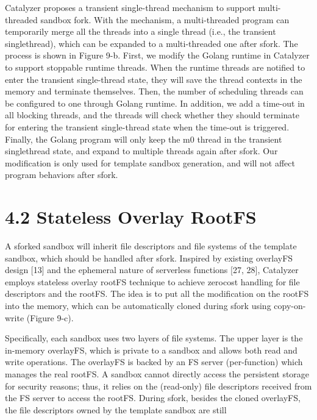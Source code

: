 \documentclass[
  10
]{article}
\begin{document}
Catalyzer proposes a transient single-thread mechanism to support
multi-threaded sandbox fork. With the mechanism, a multi-threaded
program can temporarily merge all the threads into a single thread
(i.e., the transient singlethread), which can be expanded to a
multi-threaded one after sfork. The process is shown in Figure 9-b.
First, we modify the Golang runtime in Catalyzer to support stoppable
runtime threads. When the runtime threads are notified to enter the
transient single-thread state, they will save the thread contexts in the
memory and terminate themselves. Then, the number of scheduling threads
can be configured to one through Golang runtime. In addition, we add a
time-out in all blocking threads, and the threads will check whether
they should terminate for entering the transient single-thread state
when the time-out is triggered. Finally, the Golang program will only
keep the m0 thread in the transient singlethread state, and expand to
multiple threads again after sfork. Our modification is only used for
template sandbox generation, and will not affect program behaviors after
sfork.

\section{4.2 Stateless Overlay RootFS}\label{stateless-overlay-rootfs}

A sforked sandbox will inherit file descriptors and file systems of the
template sandbox, which should be handled after sfork. Inspired by
existing overlayFS design {[}13{]} and the ephemeral nature of
serverless functions {[}27, 28{]}, Catalyzer employs stateless overlay
rootFS technique to achieve zerocost handling for file descriptors and
the rootFS. The idea is to put all the modification on the rootFS into
the memory, which can be automatically cloned during sfork using
copy-on-write (Figure 9-c).

Specifically, each sandbox uses two layers of file systems. The upper
layer is the in-memory overlayFS, which is private to a sandbox and
allows both read and write operations. The overlayFS is backed by an FS
server (per-function) which manages the real rootFS. A sandbox cannot
directly access the persistent storage for security reasons; thus, it
relies on the (read-only) file descriptors received from the FS server
to access the rootFS. During sfork, besides the cloned overlayFS, the
file descriptors owned by the template sandbox are still
\end{document}
